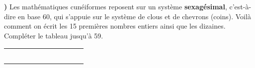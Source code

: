 \documentclass[12pt,a4paper]{article}
\newcommand{\babun}{{\AKK\dish}}
\newcommand{\babdeux}{{\AKK\min}}
\newcommand{\babtrois}{{\AKK\eshV}}
\newcommand{\babquatre}{{\AKK\shaII}}
\newcommand{\babcinq}{{\AKK\iaII}}
\newcommand{\babsix}{{\AKK\ashIII}}
\newcommand{\babsept}{{\AKK\imin}}
\newcommand{\babhuit}{{\AKK\ussu}}
\newcommand{\babneuf}{{\AKK\geshilimmu}}
\newcommand{\babdix}{{\AKK\AKKu}}
\newcommand{\babvingt}{{\AKK\man}}
\newcommand{\babtrente}{{\AKK\esh}}
\newcommand{\babquarante}{{\AKK\ninV}}
\newcommand{\babcinquante}{{\AKK\ninnu}}
\begin{document}
{\bf{})} Les mathématiques cunéiformes reposent sur un système {\bf sexagésimal}, c’est-à-dire en base 60, qui s’appuie sur le système de clous et de chevrons (coins). Voilà comment on écrit les 15 premières nombres entiers ainsi que les dizaines. Compléter le tableau jusqu'à 59.

\begin{center}
\begin{tabular}{|*{10}{C{1.2}|}}
   \hline
   & \babun
   & \babdeux
   & \babtrois
   & \babquatre
   & \babcinq
   & \babsix
   & \babsept
   & \babhuit
   & \babneuf
   \\
   \hline
   \babdix
   & \babdix\!\!\!\babun
   & \babdix\!\!\!\babdeux
   & \babdix\!\!\!\babtrois
   & \babdix\!\!\!\babquatre
   & \babdix\!\!\!\babcinq
   & \mbox{}{\red \babdix\!\!\!\babsix}
   & \mbox{}{\red \babdix\!\!\!\babsept}
   & \mbox{}{\red \babdix\!\!\!\babhuit}
   & \mbox{}{\red \babdix\!\!\!\babneuf} \\
   \hline
   \babvingt 
   & \mbox{}{\red \babvingt\!\!\!\babun}
   & \mbox{}{\red \babvingt\!\!\!\babdeux}
   & \mbox{}{\red \babvingt\!\!\!\babtrois}
   & \mbox{}{\red \babvingt\!\!\!\babquatre}
   & \mbox{}{\red \babvingt\!\!\!\babcinq}
   & \mbox{}{\red \babvingt\!\!\!\babsix}
   & \mbox{}{\red \babvingt\!\!\!\babsept}
   & \mbox{}{\red \babvingt\!\!\!\babhuit}
   & \mbox{}{\red \babvingt\!\!\!\babneuf} \\
   \hline
   \babtrente
   & \mbox{}{\red \babtrente\!\!\!\babun}
   & \mbox{}{\red \babtrente\!\!\!\babdeux}
   & \mbox{}{\red \babtrente\!\!\!\babtrois}
   & \mbox{}{\red \babtrente\!\!\!\babquatre}
   & \mbox{}{\red \babtrente\!\!\!\babcinq}
   & \mbox{}{\red \babtrente\!\!\!\babsix}
   & \mbox{}{\red \babtrente\!\!\!\babsept}
   & \mbox{}{\red \babtrente\!\!\!\babhuit}
   & \mbox{}{\red \babtrente\!\!\!\babneuf} \\
   \hline
   \babquarante
   & \mbox{}{\red \babquarante\!\!\!\babun}
   & \mbox{}{\red \babquarante\!\!\!\babdeux}
   & \mbox{}{\red \babquarante\!\!\!\babtrois}
   & \mbox{}{\red \babquarante\!\!\!\babquatre}
   & \mbox{}{\red \babquarante\!\!\!\babcinq}
   & \mbox{}{\red \babquarante\!\!\!\babsix}
   & \mbox{}{\red \babquarante\!\!\!\babsept}
   & \mbox{}{\red \babquarante\!\!\!\babhuit}
   & \mbox{}{\red \babquarante\!\!\!\babneuf} \\
   \hline
   \babcinquante
   & \mbox{}{\red \babcinquante\!\!\!\babun}
   & \mbox{}{\red \babcinquante\!\!\!\babdeux}
   & \mbox{}{\red \babcinquante\!\!\!\babtrois}
   & \mbox{}{\red \babcinquante\!\!\!\babquatre}
   & \mbox{}{\red \babcinquante\!\!\!\babcinq}
   & \mbox{}{\red \babcinquante\!\!\!\babsix}
   & \mbox{}{\red \babcinquante\!\!\!\babsept}
   & \mbox{}{\red \babcinquante\!\!\!\babhuit}
   & \mbox{}{\red \babcinquante\!\!\!\babneuf} \\
   \hline
\end{tabular}
\end{center}
\end{document}
